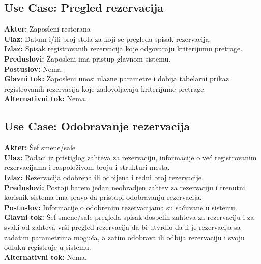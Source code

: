 \documentclass{article}
\begin{document}
\subsection{\textbf{Use Case}: Pregled rezervacija}
\textbf{Akter:} Zaposleni restorana\\
\textbf{Ulaz:} Datum i/ili broj stola za koji se pregleda spisak rezervacija.\\
\textbf{Izlaz:} Spisak registrovanih rezervacija koje odgovaraju kriterijumu pretrage.\\
\textbf{Preduslovi:} Zaposleni ima pristup glavnom sistemu.\\
\textbf{Postuslov:} Nema.\\
\textbf{Glavni tok:} Zaposleni unosi ulazne parametre i dobija tabelarni prikaz registrovanih rezervacija koje zadovoljavaju kriterijume pretrage.\\
\textbf{Alternativni tok:} Nema.\\

\subsection{\textbf{Use Case}:  Odobravanje rezervacija}
\textbf{Akter:} Šef smene/sale\\
\textbf{Ulaz:} Podaci iz pristiglog zahteva za rezervaciju, informacije o već registrovanim rezervacijama i raspoloživom broju i strukturi mesta.\\
\textbf{Izlaz:} Rezervacija odobrena ili odbijena i redni broj rezervacije.\\
\textbf{Preduslovi:} Postoji barem jedan neobradjen zahtev za rezervaciju i trenutni korisnik sistema ima pravo da pristupi odobravanju rezervacija.\\
\textbf{Postuslov:} Informacije o odobrenim rezervacijama su sačuvane u sistemu.\\
\textbf{Glavni tok:} Šef smene/sale pregleda spisak dospelih zahteva za rezervaciju i za svaki od zahteva vrši pregled rezervacija da bi utvrdio da li je rezervacija sa zadatim parametrima moguća, a zatim odobrava ili odbija rezervaciju i svoju odluku registruje u sistemu.\\
\textbf{Alternativni tok:} Nema.\\
\end{document}
